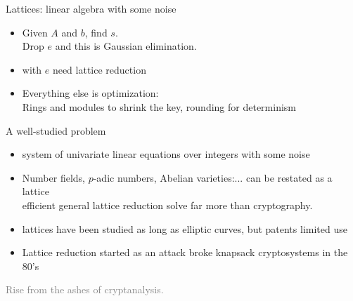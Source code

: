 \documentclass[aspectratio=169]{beamer}
\newcommand{\cgrey}[1]{\textcolor{grey}{#1}}
\begin{document}
\begin{frame}{Lattices: linear algebra with some noise}
  \centering
  \vspace{4mm}
  \begin{itemize}\footnotesize
    \item<2-> Given $A$ and $b$, find $s$. \\\pause \alert{Drop $e$ and this is
      Gaussian elimination}. \pause
    \item<3-> with $e$ need lattice reduction
    \item<4-> Everything else is optimization: \pause  \\ Rings and modules to shrink the key, rounding for determinism
  \end{itemize}
\end{frame}

\begin{frame}{A well-studied problem}
  \begin{itemize}
    \item system of univariate linear equations over integers with some noise\pause 
    \item Number fields, $p$-adic numbers, Abelian varieties:... can be restated as a  lattice\\ \pause
      efficient general lattice  reduction solve far more than cryptography. \pause
    \item lattices have been studied as long as elliptic curves, but patents limited use \pause
    \item \alert{Lattice reduction started as an attack} \pause 
      broke
      knapsack cryptosystems in the 80's \pause 
  \end{itemize}
  \bigskip
  \begin{center}
    \cgrey{Rise from the ashes of cryptanalysis.}
  \end{center}
\end{frame}
\end{document}
